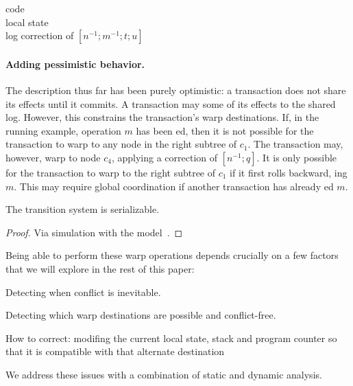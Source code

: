 code\\
local state\\
log correction of $[n^{-1};m^{-1};t;u]$

\paragraph{Adding pessimistic behavior.}
%
The description thus far has been purely optimistic: a transaction
does not share its effects until it commits. A transaction may
\PUSH{} some of its effects to the shared log. However, this
constrains the transaction's warp destinations. 
%
If, in the running example, operation $m$ has been \PUSH{}ed, then it
is not possible for the transaction to warp to any node in the right
subtree of $c_1$. The transaction may, however, warp to node $c_4$,
applying a correction of $[n^{-1};q]$.
%
It is only possible for the transaction to warp to the right subtree
of $c_1$ if it first rolls backward, \UNPUSH{}ing $m$. This may
require global coordination if another transaction has already \PULL{}ed $m$.

\begin{theorem} The transition system is serializable.
\begin{proof}Via simulation with the \PMPY{} model~\cite{KP:PLDI15}.
\end{proof}
\end{theorem}

Being able to perform these warp operations depends crucially on a
few factors that we will explore in the rest of this paper:
\begin{itemize*}
\item Detecting when conflict is inevitable.
\item Detecting which warp destinations are possible and conflict-free.
\item How to correct: modifing the current local state, stack and
  program counter so that it
  is compatible with that alternate destination
\end{itemize*}
We address these issues with a combination of static and dynamic analysis.


